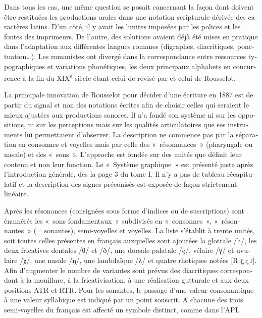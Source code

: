 \documentclass[output=paper]{../langscibook}
\begin{document}
\begin{otherlanguage}{french}
Dans tous les cas, une même question se posait concernant la façon dont doivent être restituées les productions orales dans une notation scripturale dérivée des caractères latins. D’un côté, il y avait les limites imposées par les polices et les fontes des imprimeurs. De l’autre, des solutions avaient déjà été mises en pratique dans l’adaptation aux différentes langues romanes (digraphes, diacritiques, ponctuation…). Les romanistes ont divergé dans la correspondance entre ressources typographiques et variations phonétiques, les deux principaux alphabets en concurrence à la fin du XIX\textsuperscript{e} siècle étant celui de \citet{bohmer_sonis_1871} révisé par \citet{ascoli_trascrizioni_1873} et celui de Rousselot.

La principale innovation de Rousselot pour décider d’une écriture en 1887 est de partir du signal et non des notations écrites afin de choisir celles qui seraient le mieux ajustées aux productions sonores. Il n’a fondé son système ni sur les oppositions, ni sur les perceptions mais sur les qualités articulatoires que ses instruments lui permettaient d’observer. La description ne commence pas par la séparation en consonnes et voyelles mais par celle des «~résonnances~» (pharyngale ou nasale) et des «~sons~». L’approche est fondée sur des unités que définit leur contenu et non leur fonction. Le «~Système graphique~» est présenté juste après l’introduction générale, dès la page 3 du tome I. Il n’y a pas de tableau récapitulatif et la description des signes préconisés est exposée de façon strictement linéaire.

Après les résonances (consignées sous forme d’indices ou de suscriptions) sont énumérés les «~sons fondamentaux~» subdivisés en «~consonnes~», «~résonnantes~» (= sonantes), semi-voyelles et voyelles. La liste s’établit à trente unités, soit toutes celles présentes en français auxquelles sont ajoutées la glottale /h/, les deux fricatives dentales /θ/ et /ð/, une dorsale palatale /ç/, vélaire /γ/ et uvulaire /χ/, une nasale /ŋ/, une lambdaïque /λ/ et quatre rhotiques notées [R \textlatin{ɾ}\textlatin{̪} r\textlatin{̥} \textlatin{ɾ}]. Afin d’augmenter le nombre de variantes sont prévus des diacritiques correspondant à la mouillure, à la fricativisation, à une réalisation gutturale et aux deux positions ATR et RTR. Pour les sonantes, le passage d’une valeur consonantique à une valeur syllabique est indiqué par un point souscrit. A chacune des trois semi-voyelles du français est affecté un symbole distinct, comme dans l’API.


\end{otherlanguage}
\end{document}

